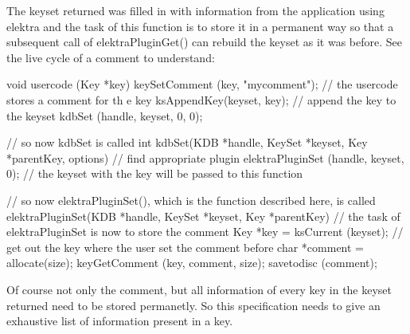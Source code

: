 The keyset {\ttfamily returned} was filled in with information from the application using elektra and the task of this function is to store it in a permanent way so that a subsequent call of elektraPluginGet() can rebuild the keyset as it was before. See the live cycle of a comment to understand: 
\begin{DoxyCode}
void usercode (Key *key)
{
        keySetComment (key, "mycomment"); // the usercode stores a comment for th
      e key
        ksAppendKey(keyset, key); // append the key to the keyset
        kdbSet (handle, keyset, 0, 0);
}

// so now kdbSet is called
int kdbSet(KDB *handle, KeySet *keyset, Key *parentKey, options)
{
        // find appropriate plugin
        elektraPluginSet (handle, keyset, 0); // the keyset with the key will be 
      passed to this function
}

// so now elektraPluginSet(), which is the function described here, is called
elektraPluginSet(KDB *handle, KeySet *keyset, Key *parentKey)
{
        // the task of elektraPluginSet is now to store the comment
        Key *key = ksCurrent (keyset); // get out the key where the user set the 
      comment before
        char *comment = allocate(size);
        keyGetComment (key, comment, size);
        savetodisc (comment);
}
\end{DoxyCode}
 Of course not only the comment, but all information of every key in the keyset {\ttfamily returned} need to be stored permanetly. So this specification needs to give an exhaustive list of information present in a key.

